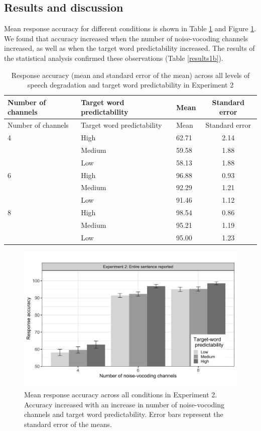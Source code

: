 \documentclass[a4paper, nobind]{templates/ociamthesis}
\begin{document}
\hypertarget{results-and-discussion-1}{%
\subsection{Results and discussion}\label{results-and-discussion-1}}

Mean response accuracy for different conditions is shown in Table \ref{summary1b} and Figure \ref{fig:figure1b}.
We found that accuracy increased when the number of noise-vocoding channels increased, as well as when the target word predictability increased.
The results of the statistical analysis confirmed these observations (Table \ref{results1b}).

\begin{longtable}[]{@{}lllc@{}}
\caption{Response accuracy (mean and standard error of the mean) across all levels of speech degradation and target word predictability in Experiment 2}
\label{summary1b}
\tabularnewline
\toprule
Number of channels & Target word predictability & Mean & Standard
error \\
\midrule
\endfirsthead
\toprule
Number of channels & Target word predictability & Mean & Standard
error \\
\midrule
\endhead
4 & High & 62.71 & 2.14 \\
& Medium & 59.58 & 1.88 \\
& Low & 58.13 & 1.88 \\
\midrule
6 & High & 96.88 & 0.93 \\
& Medium & 92.29 & 1.21 \\
& Low & 91.46 & 1.12 \\
\midrule
8 & High & 98.54 & 0.86 \\
& Medium & 95.21 & 1.19 \\
& Low & 95.00 & 1.23 \\
\bottomrule
\end{longtable}

\begin{figure}

{\centering \includegraphics[width=0.95\linewidth]{figures/results-fig/expt-1b} 

}

\caption{Mean response accuracy across all conditions in Experiment 2. Accuracy increased with an increase in number of noise-vocoding channels and target word predictability. Error bars represent the standard error of the means.}\label{fig:figure1b}
\end{figure}
\end{document}
